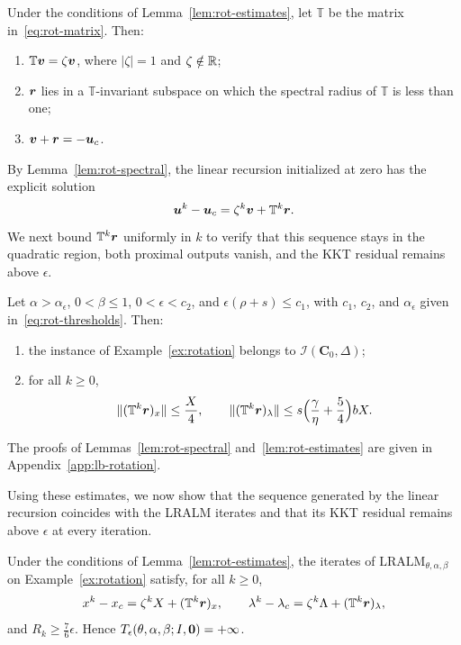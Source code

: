 \begin{lemma}
\label{lem:rot-spectral}
Under the conditions of Lemma~\ref{lem:rot-estimates}, let
\(\mathbb T\) be the matrix in~\eqref{eq:rot-matrix}. Then:
\begin{enumerate}[label=(\roman*)]
\item \(\mathbb T\bm{v}=\zeta\bm{v}\), where \(|\zeta|=1\) and \(\zeta\notin\mathbb{R}\);
\item \(\bm{r}\) lies in a \(\mathbb T\)-invariant subspace on which the spectral
  radius of \(\mathbb T\) is less than one;
\item \(\bm{v}+\bm{r}=-\bm{u}_c\).
\end{enumerate}
\end{lemma}
 
By Lemma~\ref{lem:rot-spectral}, the linear recursion initialized at zero
has the explicit solution
\[
\bm{u}^k-\bm{u}_c=\zeta^k\bm{v}+\mathbb T^k\bm{r}.
\]
We next bound \(\mathbb T^k\bm{r}\) uniformly in \(k\) to verify that this
sequence stays in the quadratic region, both proximal outputs vanish,
and the KKT residual remains above \(\epsilon\).

\begin{lemma}
\label{lem:rot-estimates}
Let \(\alpha>\alpha_\epsilon\), \(0<\beta\le1\), \(0<\epsilon<c_2\), and
\(\epsilon(\rho+s)\le c_1\), with \(c_1\), \(c_2\), and \(\alpha_\epsilon\)
given in~\eqref{eq:rot-thresholds}. Then:
\begin{enumerate}[label=(\roman*)]
\item the instance of Example~\ref{ex:rotation} belongs to
  \(\mathcal I(\mathbf C_0,\Delta)\);
\item for all \(k\ge0\),
\[
\|(\mathbb T^k\bm{r})_x\|\le\frac X4,
\qquad
\|(\mathbb T^k\bm{r})_\lambda\|\le
s\Bigl(\frac{\gamma}{\eta}+\frac54\Bigr)bX.
\]
\end{enumerate}
\end{lemma}
The proofs of Lemmas~\ref{lem:rot-spectral} and~\ref{lem:rot-estimates} are
given in Appendix~\ref{app:lb-rotation}.

Using these estimates, we now show that the sequence generated by the linear
recursion coincides with the LRALM iterates and that its KKT residual
remains above \(\epsilon\) at every iteration.

\begin{lemma}
\label{lem:rot-trajectory}
Under the conditions of Lemma~\ref{lem:rot-estimates}, the iterates of
\(\mathrm{LRALM}_{\theta,\alpha,\beta}\) on Example~\ref{ex:rotation}
satisfy, for all \(k\ge0\),
\[
x^k-x_c=\zeta^kX+(\mathbb T^k\bm{r})_x,
\qquad
\lambda^k-\lambda_c=\zeta^k\Lambda+(\mathbb T^k\bm{r})_\lambda,
\]
and \(R_k\ge\frac76\epsilon\). Hence
\(T_\epsilon(\theta,\alpha,\beta;I,\bm{0})=+\infty\).
\end{lemma}

